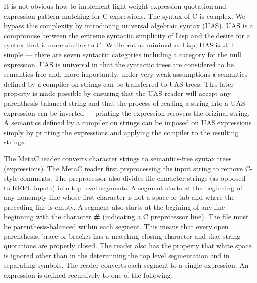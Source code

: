 \documentclass{article}
\begin{document}
It is not obvious how to implement light weight expression quotation and expression pattern matching for C expressions.  The syntax of C is complex.  We bypass this complexity by introducing universal algebraic syntax (UAS).
UAS is a compromise between the extreme syntactic simplicity of Lisp and the desire for a syntax that is more similar to C.
While not as minimal as Lisp, UAS is still simple --- there are seven syntactic categories including a category for the null expression.
UAS is universal in that the syntactic trees are considered to be semantics-free and, more importantly, under very weak assumptions a semantics defined by a compiler on strings
can be transferred to UAS trees.
This later property is made possible by ensuring that the UAS reader will accept any parenthesis-balanced string
and that the process of reading a string into a UAS expression can be inverted --- printing the expression recovers the original string.
A semantics defined by a compiler on strings can be imposed on UAS expressions simply by printing the expressions and applying the compiler to the resulting strings.

The MetaC reader converts character strings to semantics-free syntax trees (expressions).
The MetaC reader first preprocessing the input string to remove C-style comments.
The preprocessor also divides file character strings (as opposed to REPL inputs) into top level segments.
A segment starts at the beginning of any nonempty line whose first character is not a space or tab and where the preceding line is empty.
A segment also starts at the begining of any line beginning with the character {\bf \#} (indicating a C preprocessor line).
The file must be parenthesis-balanced within each segment.  This means that every open parenthesis, brace or bracket has a matching closing character and that string quotations
are properly closed.  The reader also has the property that white space is ignored other than in the determining the top level segmentation and in separating symbols.
The reader converts each segment to a single expression.
An expression is defined recursively to one of the following.
\end{document}
